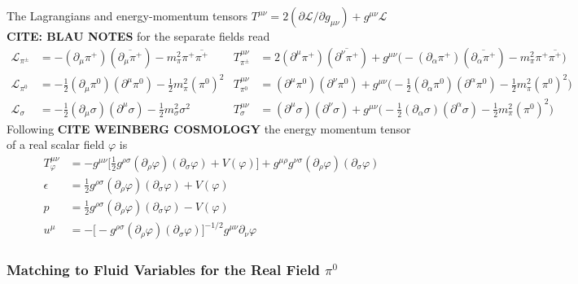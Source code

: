 The Lagrangians and energy-momentum tensors $T^{\mu\nu}=2(\partial\mathscr{L}/\partial g_{\mu\nu})+g^{\mu\nu}\mathscr{L}$ \textbf{CITE: BLAU NOTES} for the separate fields read
\begin{subequations}
    \begin{align}
        \mathscr{L}_{\pi^\pm}&=-(\partial_\mu\pi^+)(\overline{\partial_\mu\pi^+})-m_\pi^2\pi^+\overline{\pi^+}&T^{\mu\nu}_{\pi^\pm}&=2(\partial^\mu\pi^+)(\overline{\partial^\nu\pi^+})+g^{\mu\nu}\big(-(\partial_\alpha\pi^+)(\overline{\partial_\alpha\pi^+})-m_\pi^2\pi^+\overline{\pi^+}\big)\\
        \mathscr{L}_{\pi^0}&=-\frac{1}{2}(\partial_\mu\pi^0)(\partial^\mu\pi^0)-\frac{1}{2}m_\pi^2(\pi^0)^2&T^{\mu\nu}_{\pi^0}&=(\partial^\mu\pi^0)(\partial^\nu\pi^0)+g^{\mu\nu}\big(-\frac{1}{2}(\partial_\alpha\pi^0)(\partial^\alpha\pi^0)-\frac{1}{2}m_\pi^2(\pi^0)^2\big)\\
        \mathscr{L}_\sigma&=-\frac{1}{2}(\partial_\mu\sigma)(\partial^\mu\sigma)-\frac{1}{2}m_\sigma^2\sigma^2&T^{\mu\nu}_{\sigma}&=(\partial^\mu\sigma)(\partial^\nu\sigma)+g^{\mu\nu}\big(-\frac{1}{2}(\partial_\alpha\sigma)(\partial^\alpha\sigma)-\frac{1}{2}m_\pi^2(\pi^0)^2\big)
    \end{align}
\end{subequations}
Following \textbf{CITE WEINBERG COSMOLOGY} the energy momentum tensor of a real scalar field $\varphi$ is
\begin{subequations}
    \begin{align}
        T_\varphi^{\mu\nu}&=-g^{\mu\nu}\big[\frac{1}{2}g^{\rho\sigma}(\partial_\rho\varphi)(\partial_\sigma\varphi)+V(\varphi)\big]+g^{\mu\rho}g^{\nu\sigma}(\partial_\rho\varphi)(\partial_\sigma\varphi)\\
        \epsilon&=\frac{1}{2}g^{\rho\sigma}(\partial_\rho\varphi)(\partial_\sigma\varphi)+V(\varphi)\\
        p&=\frac{1}{2}g^{\rho\sigma}(\partial_\rho\varphi)(\partial_\sigma\varphi)-V(\varphi)\\
        u^\mu&=-\big[-g^{\rho\sigma}(\partial_\rho\varphi)(\partial_\sigma\varphi)\big]^{-1/2}g^{\mu\nu}\partial_\nu\varphi
    \end{align}
\end{subequations}
\subsubsection{Matching to Fluid Variables for the Real Field $\pi^0$}

